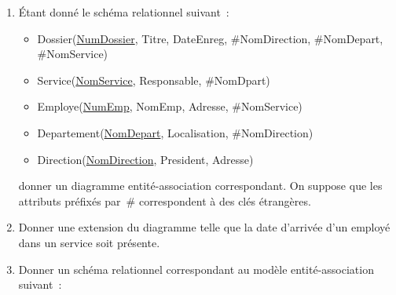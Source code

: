 \documentclass[a4paper,11pt]{article}
\begin{document}
\begin{enumerate}
  \item
    Étant donné le schéma relationnel suivant~:
    \begin{itemize}
      \item Dossier(\underline{NumDossier}, Titre, DateEnreg, \#NomDirection, \#NomDepart, \#NomService)
      \item Service(\underline{NomService}, Responsable, \#NomDpart)
      \item Employe(\underline{NumEmp}, NomEmp, Adresse, \#NomService)
      \item Departement(\underline{NomDepart}, Localisation, \#NomDirection)
      \item Direction(\underline{NomDirection}, President, Adresse)
    \end{itemize}
    donner un diagramme entité-association correspondant. On suppose que les attributs préfixés par~\# correspondent à des clés étrangères.
  \item Donner une extension du diagramme telle que la date d'arrivée d'un employé dans un service soit présente.
  \item Donner un schéma relationnel correspondant au modèle entité-association suivant~:\\\\
\end{enumerate}
\end{document}
